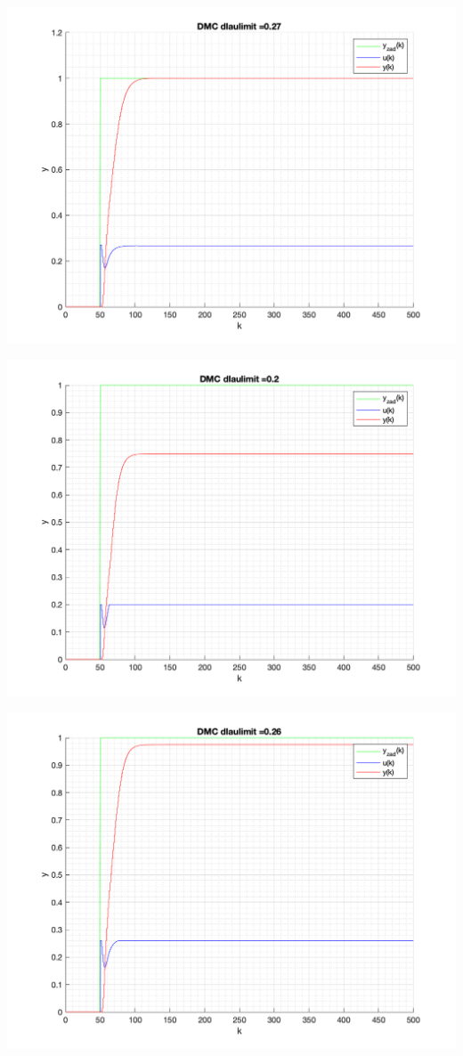 \documentclass[a4paper, 11pt]{article}
\begin{document}
\begin{enumerate}
 \includegraphics[width=\linewidth]{./ModelsP6_ulimit/P4_DMC_ulimit_0_27_png.png} 
 
 \includegraphics[width=\linewidth]{./ModelsP6_ulimit/P4_DMC_ulimit_0_2_png.png} 
 
 \includegraphics[width=\linewidth]{./ModelsP6_ulimit/P4_DMC_ulimit_0_26_png.png} 
 

\end{enumerate}
\end{document}

